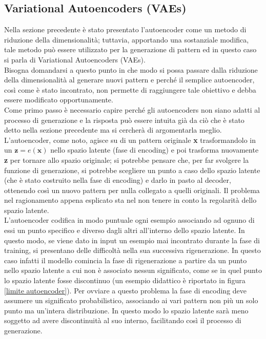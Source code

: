 \newpage

\subsection{Variational Autoencoders (VAEs)}
\label{VAEs}

Nella sezione precedente è stato presentato l'autoencoder come un metodo di riduzione della dimensionalità; tuttavia, apportando una sostanziale modifica, tale metodo può essere utilizzato per la generazione di pattern ed in questo caso si parla di Variational Autoencoders (VAEs). \\ 
Bisogna domandarsi a questo punto in che modo si possa passare dalla riduzione della dimensionalità al generare nuovi pattern e perché il semplice autoencoder, così come è stato incontrato, non permette di raggiungere tale obiettivo e debba essere modificato opportunamente. \\
Come primo passo è necessario capire perché gli autoencoders non siano adatti al processo di generazione e la risposta può essere intuita già da ciò che è stato detto nella sezione precedente ma si cercherà di argomentarla meglio. L'autoencoder, come noto, agisce su di un pattern originale \textbf{x} trasformandolo in un $\textbf{z} = e(\textbf{x})$ nello spazio latente (fase di encoding)  e poi trasforma nuovamente \textbf{z} per tornare allo spazio originale; si potrebbe pensare che, per far svolgere la funzione di generazione, si potrebbe scegliere un punto a caso dello spazio latente (che è stato costruito nella fase di encoding) e darlo in pasto al decoder, ottenendo così un nuovo pattern per nulla collegato a quelli originali. Il problema nel ragionamento appena esplicato sta nel non tenere in conto la regolarità dello spazio latente.\\ 
L'autoencoder codifica in modo puntuale ogni esempio associando ad ognuno di essi un punto specifico e diverso dagli altri all'interno dello spazio latente. In questo modo, se viene dato in input un esempio mai incontrato durante la fase di training, si presentano delle difficoltà nella sua successiva rigenerazione. In questo caso infatti il modello comincia la fase di rigenerazione a partire da un punto nello spazio latente a cui non è associato nessun significato, come se in quel punto lo spazio latente fosse discontinuo (un esempio didattico è riportato in figura \ref{limite autoencoder}). Per ovviare a questo problema la fase di encoding deve assumere un significato probabilistico, associando ai vari pattern non più un solo punto ma un'intera distribuzione. In questo modo lo spazio latente sarà meno soggetto ad avere discontinuità al suo interno, facilitando così il processo di generazione.

